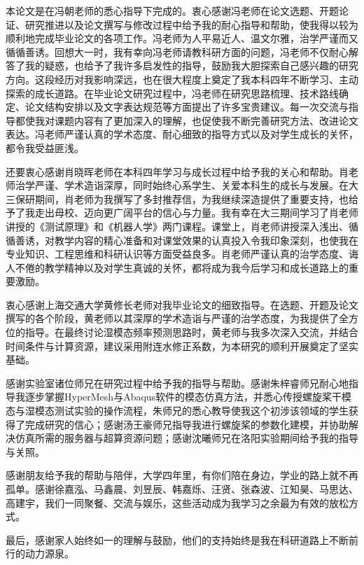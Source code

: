 \documentclass[type = bachelor]{whu-thesis}
\begin{document}
\begin{acknowledgements}
本论文是在冯朝老师的悉心指导下完成的。衷心感谢冯老师在论文选题、开题论证、研究推进以及论文撰写与修改过程中给予我的耐心指导和帮助，使我得以较为顺利地完成毕业论文的各项工作。冯老师为人平易近人、温文尔雅，治学严谨而又循循善诱。回想大一时，我有幸向冯老师请教科研方面的问题，冯老师不仅耐心解答了我的疑惑，也给予了我许多启发性的指导，鼓励我大胆探索自己感兴趣的研究方向。这段经历对我影响深远，也在很大程度上奠定了我本科四年不断学习、主动探索的成长道路。在毕业论文研究过程中，冯老师在研究思路梳理、技术路线确定、论文结构安排以及文字表达规范等方面提出了许多宝贵建议。每一次交流与指导都使我对课题内容有了更加深入的理解，也促使我不断完善研究方法、改进论文表达。冯老师严谨认真的学术态度、耐心细致的指导方式以及对学生成长的关怀，都令我受益匪浅。

还要衷心感谢肖晓晖老师在本科四年学习与成长过程中给予我的关心和帮助。肖老师治学严谨、学术造诣深厚，同时始终心系学生、关爱本科生的成长与发展。在大三保研期间，肖老师为我撰写了多封推荐信，为我继续深造提供了重要支持，也给予了我走出母校、迈向更广阔平台的信心与力量。我有幸在大三期间学习了肖老师讲授的《测试原理》和《机器人学》两门课程。课堂上，肖老师讲授深入浅出、循循善诱，对教学内容的精心准备和对课堂效果的认真投入令我印象深刻，也使我在专业知识、工程思维和科研认识等方面受益良多。肖老师严谨认真的治学态度、诲人不倦的教学精神以及对学生真诚的关怀，都将成为我今后学习和成长道路上的重要激励。

衷心感谢上海交通大学黄修长老师对我毕业论文的细致指导。在选题、开题及论文撰写的各个阶段，黄老师以其深厚的学术造诣与严谨的治学态度，为我提供了全方位的指导。在最终讨论湿模态频率预测思路时，黄老师与我多次深入交流，并结合时间条件与计算资源，建议采用附连水修正系数，为本研究的顺利开展奠定了坚实基础。

感谢实验室诸位师兄在研究过程中给予我的指导与帮助。感谢朱梓睿师兄耐心地指导我逐步掌握HyperMesh与Abaqus软件的模态仿真方法，并悉心传授螺旋桨干模态与湿模态测试实验的操作流程，朱师兄的悉心教导使我这个初涉该领域的学生获得了完成研究的信心；感谢汤王豪师兄指导我进行螺旋桨的参数化建模，并协助解决仿真所需的服务器与超算资源问题；感谢沈曦师兄在洛阳实验期间给予我的指导与关照。

感谢朋友给予我的帮助与陪伴，大学四年里，有你们陪在身边，学业的路上就不再孤单。感谢徐嘉泓、马鑫晨、刘昱辰、韩嘉烁、汪贤、张森波、江知昊、马思达、高建宇，我们一同聚餐、交流与娱乐，这些活动成为我学习之余最为有效的放松方式。

最后，感谢家人始终如一的理解与鼓励，他们的支持始终是我在科研道路上不断前行的动力源泉。
\end{acknowledgements}

\end{document}
